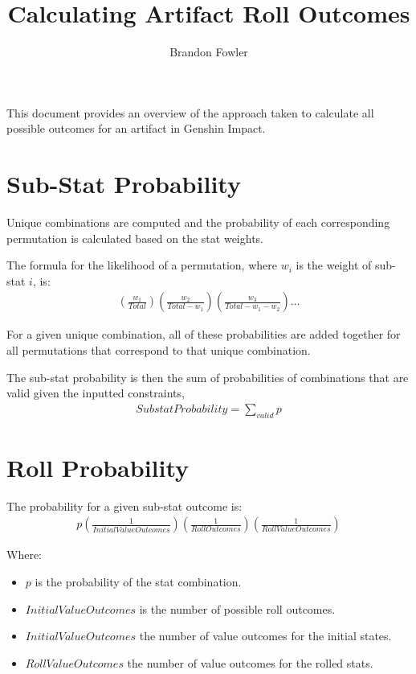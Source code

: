 \documentclass[12pt]{article}
\title{Calculating Artifact Roll Outcomes}
\author{Brandon Fowler}
\begin{document}
	
\maketitle

This document provides an overview of the approach taken to calculate all possible outcomes for an artifact in Genshin Impact.

\tableofcontents
\pagebreak

\section{Sub-Stat Probability}
	
Unique combinations are computed and the probability of each corresponding permutation is calculated based on the stat weights.

The formula for the likelihood of a permutation, where $w_i$ is the weight of sub-stat $i$, is:
\begin{align*}
	\left(\frac{w_1}{Total}\right)\left(\frac{w_2}{Total - w_1}\right)\left(\frac{w_3}{Total - w_1 - w_2}\right)\dots
\end{align*}

For a given unique combination, all of these probabilities are added together for all permutations that correspond to that unique combination.

The sub-stat probability is then the sum of probabilities of combinations that are valid given the inputted constraints,
\begin{align*}
	SubstatProbability = \sum_{valid} p
\end{align*}
	
\section{Roll Probability}

The probability for a given sub-stat outcome is:
\begin{align*}
	p\left(\frac{1}{InitialValueOutcomes}\right)\left(\frac{1}{RollOutcomes}\right)\left(\frac{1}{RollValueOutcomes}\right)
\end{align*}

Where:
\begin{itemize}[]
	\item $p$ is the probability of the stat combination.
	\item $InitialValueOutcomes$ is the number of possible roll outcomes.
	\item $InitialValueOutcomes$ the number of value outcomes for the initial states.
	\item $RollValueOutcomes$ the number of value outcomes for the rolled stats.
\end{itemize}
\end{document}
